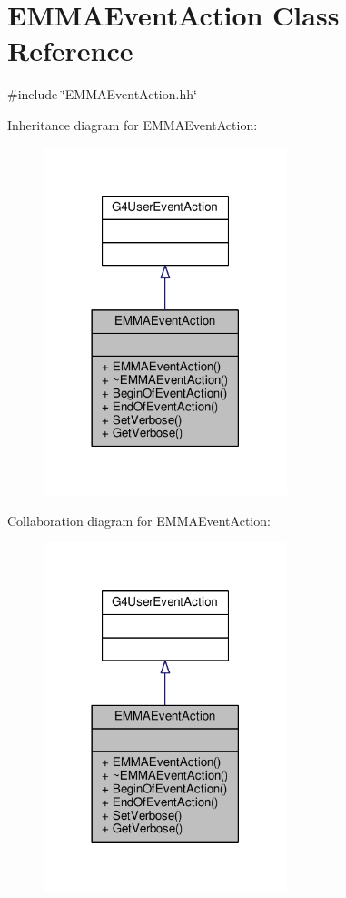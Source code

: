 \hypertarget{classEMMAEventAction}{}\section{E\+M\+M\+A\+Event\+Action Class Reference}
\label{classEMMAEventAction}


{\ttfamily \#include \char`\"{}E\+M\+M\+A\+Event\+Action.\+hh\char`\"{}}



Inheritance diagram for E\+M\+M\+A\+Event\+Action\+:
\nopagebreak
\begin{figure}[H]
\begin{center}
\leavevmode
\includegraphics[width=201pt]{classEMMAEventAction__inherit__graph}
\end{center}
\end{figure}


Collaboration diagram for E\+M\+M\+A\+Event\+Action\+:
\nopagebreak
\begin{figure}[H]
\begin{center}
\leavevmode
\includegraphics[width=201pt]{classEMMAEventAction__coll__graph}
\end{center}
\end{figure}
